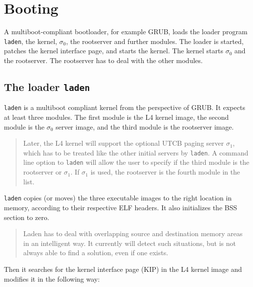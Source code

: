 \documentclass[9pt,a4paper]{extarticle}
\newenvironment{comment}{\footnotesize \begin{quote}}{\end{quote}}
\begin{document}
\section{Booting}

A multiboot-compliant bootloader, for example GRUB, loads the loader
program \texttt{laden}, the kernel, $\sigma_0$, the rootserver and
further modules.  The loader is started, patches the kernel interface
page, and starts the kernel.  The kernel starts $\sigma_0$ and the
rootserver.  The rootserver has to deal with the other modules.


\subsection{The loader \texttt{laden}}

\texttt{laden} is a multiboot compliant kernel from the perspective of
GRUB.  It expects at least three modules.  The first module is the L4
kernel image, the second module is the $\sigma_0$ server image, and
the third module is the rootserver image.

\begin{comment}
  Later, the L4 kernel will support the optional UTCB paging server
  $\sigma_1$, which has to be treated like the other initial servers
  by \texttt{laden}.  A command line option to \texttt{laden} will
  allow the user to specify if the third module is the rootserver or
  $\sigma_1$.  If $\sigma_1$ is used, the rootserver is the fourth
  module in the list.
\end{comment}

\texttt{laden} copies (or moves) the three executable images to the
right location in memory, according to their respective ELF headers.
It also initializes the BSS section to zero.

\begin{comment}
  Laden has to deal with overlapping source and destination memory
  areas in an intelligent way.  It currently will detect such
  situations, but is not always able to find a solution, even if one
  exists.
\end{comment}

Then it searches for the kernel interface page (KIP) in the L4 kernel
image and modifies it in the following way:
\end{document}
